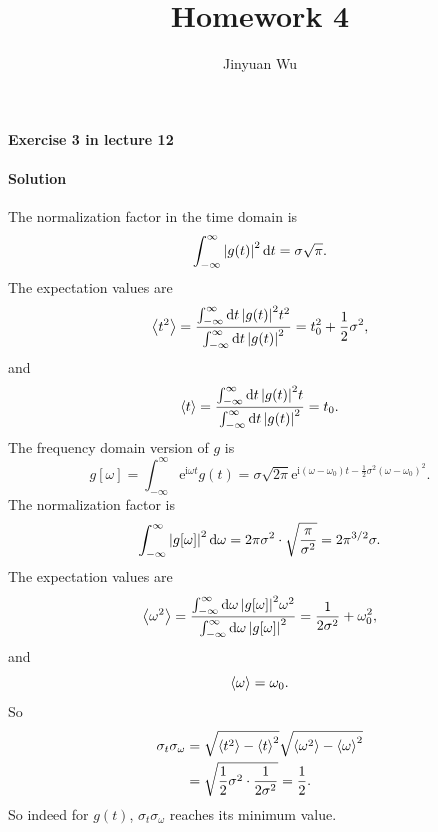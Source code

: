 \documentclass[hyperref, a4paper]{article}
\title{Homework 4}
\author{Jinyuan Wu}
\newcommand*{\ii}{\mathrm{i}}
\newcommand*{\ee}{\mathrm{e}}
\begin{document}
\maketitle

\paragraph{Exercise 3 in lecture 12}

\paragraph{Solution} The normalization factor in the time domain is 
\begin{equation}
    \int_{-\infty}^\infty \abs{g(t)}^2 \dd{t} = \sigma \sqrt{\pi}.
\end{equation}
The expectation values are 
\begin{equation}
    \expval{t^2} = \frac{\int_{-\infty}^\infty \dd{t} \abs{g(t)}^2 t^2 }{\int_{-\infty}^\infty \dd{t} \abs{g(t)}^2}
    = t_0^2 + \frac{1}{2} \sigma^2,
\end{equation}
and 
\begin{equation}
    \expval{t} = \frac{\int_{-\infty}^\infty \dd{t} \abs{g(t)}^2 t }{\int_{-\infty}^\infty \dd{t} \abs{g(t)}^2}
    = t_0.
\end{equation}
The frequency domain version of $g$ is 
\begin{equation}
    g[\omega] = \int_{-\infty}^\infty \ee^{\ii \omega t} g(t) 
    = \sigma \sqrt{2\pi} \ee^{\ii (\omega - \omega_0) t - \frac{1}{2} \sigma^2 (\omega - \omega_0)^2}.
\end{equation}
The normalization factor is 
\begin{equation}
    \int_{-\infty}^\infty \abs{g[\omega]}^2 \dd{\omega} 
    = 2 \pi \sigma^2 \cdot \sqrt{\frac{\pi}{\sigma^2}} = 2 \pi^{3/2} \sigma.
\end{equation}
The expectation values are 
\begin{equation}
    \expval{\omega^2} = \frac{
        \int_{-\infty}^\infty \dd{\omega} \abs{g[\omega]}^2 \omega^2
    }{
        \int_{-\infty}^\infty \dd{\omega} \abs{g[\omega]}^2
    } = \frac{1}{2 \sigma^2} + \omega_0^2,
\end{equation}
and 
\begin{equation}
    \expval{\omega} = \omega_0.
\end{equation}
So 
\begin{equation}
    \begin{aligned}
        \sigma_t \sigma_\omega &= 
        \sqrt{ \expval{t^2} - \expval{t}^2 } \sqrt{ \expval{\omega^2} - \expval{\omega}^2 } \\
        &= \sqrt{ \frac{1}{2} \sigma^2 \cdot \frac{1}{2 \sigma^2} } = \frac{1}{2}.
    \end{aligned}
\end{equation}
So indeed for $g(t)$,
$\sigma_t \sigma_\omega$ reaches its minimum value.
\end{document}

